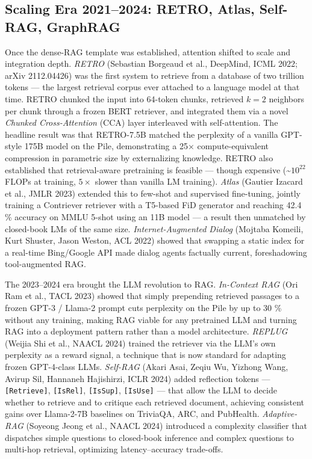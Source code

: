 \subsection{Scaling Era 2021--2024: RETRO, Atlas, Self-RAG, GraphRAG}\label{scaling-era-20212024-retro-atlas-self-rag-graphrag}

Once the dense-RAG template was established, attention shifted to scale and integration depth. \emph{RETRO} (Sebastian Borgeaud et al., DeepMind, ICML 2022; arXiv 2112.04426) was the first system to retrieve from a database of two trillion tokens --- the largest retrieval corpus ever attached to a language model at that time. RETRO chunked the input into 64-token chunks, retrieved \(k=2\) neighbors per chunk through a frozen BERT retriever, and integrated them via a novel \emph{Chunked Cross-Attention} (CCA) layer interleaved with self-attention. The headline result was that RETRO-7.5B matched the perplexity of a vanilla GPT-style 175B model on the Pile, demonstrating a 25× compute-equivalent compression in parametric size by externalizing knowledge. RETRO also established that retrieval-aware pretraining is feasible --- though expensive (\textasciitilde{}\(10^{22}\) FLOPs at training, \(5\times\) slower than vanilla LM training). \emph{Atlas} (Gautier Izacard et al., JMLR 2023) extended this to few-shot and supervised fine-tuning, jointly training a Contriever retriever with a T5-based FiD generator and reaching 42.4 \% accuracy on MMLU 5-shot using an 11B model --- a result then unmatched by closed-book LMs of the same size. \emph{Internet-Augmented Dialog} (Mojtaba Komeili, Kurt Shuster, Jason Weston, ACL 2022) showed that swapping a static index for a real-time Bing/Google API made dialog agents factually current, foreshadowing tool-augmented RAG.

The 2023--2024 era brought the LLM revolution to RAG. \emph{In-Context RAG} (Ori Ram et al., TACL 2023) showed that simply prepending retrieved passages to a frozen GPT-3 / Llama-2 prompt cuts perplexity on the Pile by up to 30 \% without any training, making RAG viable for any pretrained LLM and turning RAG into a deployment pattern rather than a model architecture. \emph{REPLUG} (Weijia Shi et al., NAACL 2024) trained the retriever via the LLM's own perplexity as a reward signal, a technique that is now standard for adapting frozen GPT-4-class LLMs. \emph{Self-RAG} (Akari Asai, Zeqiu Wu, Yizhong Wang, Avirup Sil, Hannaneh Hajishirzi, ICLR 2024) added reflection tokens --- \texttt{{[}Retrieve{]}}, \texttt{{[}IsRel{]}}, \texttt{{[}IsSup{]}}, \texttt{{[}IsUse{]}} --- that allow the LLM to decide whether to retrieve and to critique each retrieved document, achieving consistent gains over Llama-2-7B baselines on TriviaQA, ARC, and PubHealth. \emph{Adaptive-RAG} (Soyeong Jeong et al., NAACL 2024) introduced a complexity classifier that dispatches simple questions to closed-book inference and complex questions to multi-hop retrieval, optimizing latency--accuracy trade-offs.

